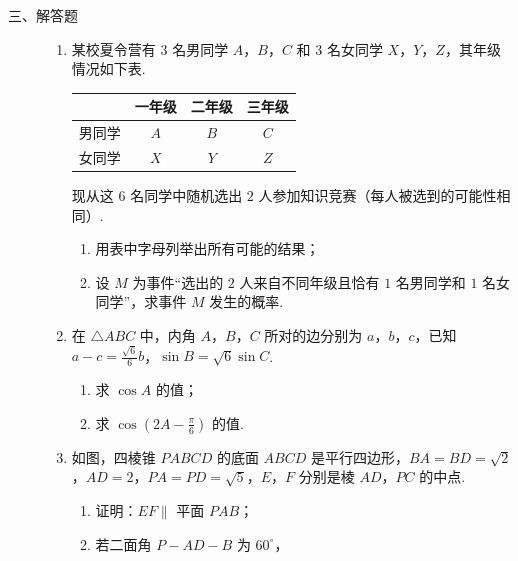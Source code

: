 \begin{description}

    \item[三、解答题]

    \begin{enumerate}[leftmargin=5pt]

      \addtocounter{enumi}{+14}

        \item 某校夏令营有 \(3\) 名男同学 \(A\)，\(B\)，\(C\) 和 \(3\) 名女同学 \(X\)，\(Y\)，\(Z\)，其年级情况如下表.

\begin{center}
\begin{tabular}{c|ccc}
\hline
 & 一年级 & 二年级 & 三年级 \\
\hline
男同学 & \(A\) & \(B\) & \(C\) \\
\hline
女同学 & \(X\) & \(Y\) & \(Z\) \\
\hline
\end{tabular}
\end{center}

现从这 \(6\) 名同学中随机选出 \(2\) 人参加知识竞赛（每人被选到的可能性相同）.

\begin{enumerate}
\item 用表中字母列举出所有可能的结果；
\item 设 \(M\) 为事件“选出的 \(2\) 人来自不同年级且恰有 \(1\) 名男同学和 \(1\) 名女同学”，求事件 \(M\) 发生的概率.
\end{enumerate}

        \item 在 \(\triangle ABC\) 中，内角 \(A\)，\(B\)，\(C\) 所对的边分别为 \(a\)，\(b\)，\(c\)，已知 \(a - c = \frac{\sqrt{6}}{6} b\)，\(\sin B = \sqrt{6} \sin C\).

\begin{enumerate}
\item 求 \(\cos A\) 的值；
\item 求 \( \cos\left(2A-\frac{\pi}{6}\right) \) 的值.
\end{enumerate}

        \item 如图，四棱锥 \(PABCD\) 的底面 \(ABCD\) 是平行四边形，\(BA = BD = \sqrt{2}\)，\(AD = 2\)，\(PA = PD = \sqrt{5}\)，\(E\)，\(F\) 分别是棱 \(AD\)，\(PC\) 的中点.

\begin{enumerate}
\item 证明：\(EF \parallel\) 平面 \(PAB\)；
\item 若二面角 \(P - AD - B\) 为 \(60^{\circ}\)，


\end{enumerate}
\end{enumerate}
\end{description}
